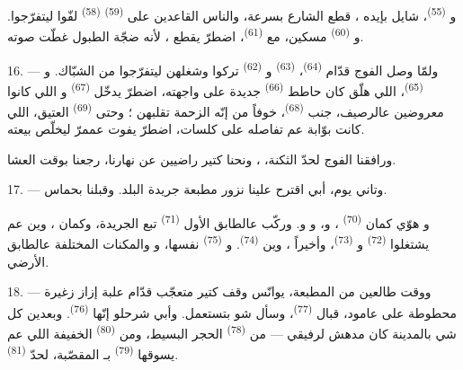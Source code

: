 و \textsuperscript{(55)}، شايل بإيده
، قطع الشارع بسرعة، والناس القاعدين على
 \textsuperscript{(59)} 
\textsuperscript{(58)} لفّوا ليتفرّجوا. و
\textsuperscript{(60)} مسكين، مع 
\textsuperscript{(61)}، اضطرّ يقطع ، لأنه ضجّة الطبول
غطّت صوته.

16. --- ولمّا وصل الفوج قدّام 
\textsuperscript{(64)}،  \textsuperscript{(63)}
و \textsuperscript{(62)} تركوا  وشغلهن ليتفرّجوا من الشبّاك. و
\textsuperscript{(65)}، اللي هلّق كان حاطط 
\textsuperscript{(66)} جديدة على واجهته، اضطرّ يدخّل 
\textsuperscript{(67)} و اللي كانوا معروضين عالرصيف، جنب
 \textsuperscript{(68)}، خوفاً من إنّه الزحمة
تقلبهن ؛ وحتى  \textsuperscript{(69)} العتيق،
اللي كانت بوّابة عم تفاصله على كلسات، اضطرّ يفوت عممرّ ليخلّص بيعته.

ورافقنا الفوج لحدّ الثكنة، ، ونحنا كتير راضيين عن نهارنا،
رجعنا بوقت العشا.

\VUsaut{3.0mm}

17. --- وتاني يوم، أبي اقترح علينا نزور مطبعة جريدة البلد. وقبلنا
بحماس.

و هوّي كمان  \textsuperscript{(70)}
، و، و
و. وركّب عالطابق الأول 
\textsuperscript{(71)} تبع الجريدة، وكمان ، وين عم
يشتغلوا  \textsuperscript{(72)}
و \textsuperscript{(73)}، وأخيراً ، وين  \textsuperscript{(74)}.
و \textsuperscript{(75)} نفسها، و
والمكنات المختلفة عالطابق الأرضي.

\VUsaut{3.0mm}

18. --- ووقت طالعين من المطبعة، يوانّس وقف كتير متعجّب قدّام علبة
إزاز زغيرة محطوطة على عامود، قبال 
\textsuperscript{(77)}، وسأل شو بتستعمل. وأبي شرحلو إنّها  \textsuperscript{(76)}. وبعدين كل شي بالمدينة كان مدهش
لرفيقي — من  \textsuperscript{(78)} الحجر البسيط، ومن
 \textsuperscript{(80)} الخفيفة اللي عم
يسوقها  \textsuperscript{(79)} بـ المقصّبة،
لحدّ  \textsuperscript{(81)}.

